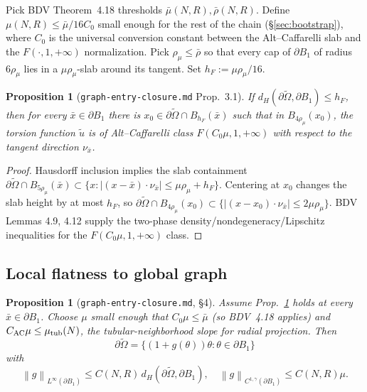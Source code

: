 \documentclass[11pt]{article}
\newtheorem{proposition}[theorem]{Proposition}
\theoremstyle{definition}
\newcommand{\norm}[1]{\left\|#1\right\|}
\newcommand{\abs}[1]{\left|#1\right|}
\begin{document}
Pick BDV Theorem~4.18 thresholds $\bar\mu(N,R),\bar\rho(N,R)$. Define
$\mu(N,R)\le\bar\mu/16C_0$ small enough for the rest of the chain
(\S\ref{sec:bootstrap}), where $C_0$ is the universal conversion constant
between the Alt--Caffarelli slab and the $F(\cdot,1,+\infty)$ normalization.
Pick $\rho_\mu\le\bar\rho$ so that every cap of $\partial B_1$ of radius
$6\rho_\mu$ lies in a $\mu\rho_\mu$-slab around its tangent. Set
$h_F:=\mu\rho_\mu/16$.

\begin{proposition}[\texttt{graph-entry-closure.md} Prop.~3.1]\label{prop:flatness}
If $d_H(\partial\widetilde\Omega,\partial B_1)\le h_F$, then for every
$\bar x\in\partial B_1$ there is $x_0\in\partial\widetilde\Omega\cap B_{h_F}(\bar x)$
such that in $B_{4\rho_\mu}(x_0)$, the torsion function $\widetilde u$ is of
Alt--Caffarelli class $F(C_0\mu,1,+\infty)$ with respect to the tangent
direction $\nu_{\bar x}$.
\end{proposition}

\begin{proof}
Hausdorff inclusion implies the slab containment
$\partial\widetilde\Omega\cap B_{5\rho_\mu}(\bar x)\subset
\{x:\abs{(x-\bar x)\cdot\nu_{\bar x}}\le\mu\rho_\mu+h_F\}$. Centering at
$x_0$ changes the slab height by at most $h_F$, so
$\partial\widetilde\Omega\cap B_{4\rho_\mu}(x_0)
\subset\{\abs{(x-x_0)\cdot\nu_{\bar x}}\le2\mu\rho_\mu\}$.
BDV Lemmas 4.9, 4.12 supply the two-phase density/nondegeneracy/Lipschitz
inequalities for the $F(C_0\mu,1,+\infty)$ class.
\end{proof}

\subsection{Local flatness to global graph}

\begin{proposition}[\texttt{graph-entry-closure.md}, \S 4]\label{prop:globalgraph}
Assume Prop.~\ref{prop:flatness} holds at every $\bar x\in\partial B_1$.
Choose $\mu$ small enough that $C_0\mu\le\bar\mu$ (so BDV~4.18 applies) and
$C_{\rm AC}\mu\le\mu_{\rm tub}(N)$, the tubular-neighborhood slope for radial
projection. Then
\[
\partial\widetilde\Omega=\{(1+g(\theta))\theta:\theta\in\partial B_1\}
\]
with
\[
\norm{g}_{L^\infty(\partial B_1)}\le C(N,R)\,d_H(\partial\widetilde\Omega,\partial B_1),
\quad
\norm{g}_{C^{1,\gamma}(\partial B_1)}\le C(N,R)\mu.
\]
\end{proposition}
\end{document}
